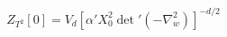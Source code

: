 \begin{equation}
   Z_{T^2} [0] = V_d\left[ \alpha' X_0^2{\det}'
   \left(-\nabla_w^2\right) \right]^{-d/2}
\end{equation}

